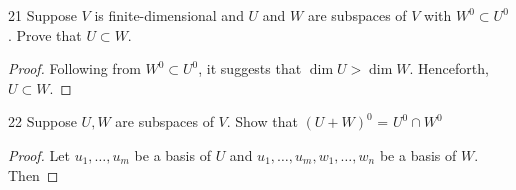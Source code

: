 \documentclass{article}
\newenvironment{problem}[1]{\begin{prob*}{#1}{}}{\end{prob*}}
\begin{document}
\begin{problem}{21}
Suppose $V$ is finite-dimensional and $U$ and $W$ are subspaces of $V$ with $W^0 \subset U^{0}$. Prove that $U \subset W$.
\end{problem}
\begin{proof}
	Following from $W^0 \subset U^{0}$, it suggests that $\operatorname{dim} U > \operatorname{dim} W$. Henceforth, $U \subset W$.
\end{proof}

\begin{problem}{22}
Suppose $U, W$ are subspaces of $V$. Show that $(U+W)^{0}$ = $U^{0} \cap W^{0}$
\end{problem}
\begin{proof}
	Let $u_1, \ldots , u_m$ be a basis of $U$ and $u_1, \ldots ,u_m, w_1, \ldots ,w_n$ be a basis of $W$. Then
\end{proof}

\end{document}
